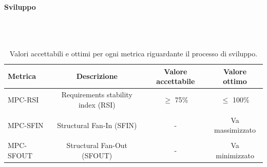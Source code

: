 \documentclass[8pt]{article}
\newcommand{\subsubsubsection}[1]{\paragraph{#1}\mbox{}\\\\}
\begin{document}
\clearpage
\subsubsubsection{Sviluppo}
\begin{table}[h]	
	\centering
	\begin{tabular}{lccc}
		\toprule
		\textbf{Metrica}& \textbf{Descrizione} & \textbf{Valore accettabile} & \textbf{Valore ottimo} \\
		\midrule
		MPC-RSI & Requirements stability index (RSI) & $\geq $ 75\%  & $\leq$ 100\% \\\\
		MPC-SFIN & Structural Fan-In (SFIN) & - & Va massimizzato\\\\
		MPC-SFOUT & Structural Fan-Out (SFOUT) & - & Va minimizzato\\
		\bottomrule
	\end{tabular}
	\caption{Valori accettabili e ottimi per ogni metrica riguardante il processo di sviluppo.}
	\label{table:Valori accettabili e ottimi per ogni metrica riguardante il processo di sviluppo.}
\end{table}
\end{document}
